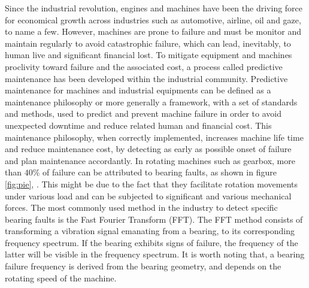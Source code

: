 \documentclass[../Main/thesis.tex]{subfiles}
\begin{document}
Since the industrial revolution, engines and machines have been the driving force for economical growth across industries such as automotive, airline, oil and gaze, to name a few. However, machines are prone to failure and must be monitor and maintain regularly to avoid catastrophic failure, which can lead, inevitably, to human live and significant financial lost. 
\justify
To mitigate equipment and machines proclivity toward failure and the associated cost, a process called predictive maintenance has been developed within the industrial community. Predictive maintenance  for machines and industrial equipments can be defined as a maintenance philosophy or more generally a framework, with a set of standards and methods, used to predict and prevent machine failure in order to avoid unexpected downtime and reduce related human and financial cost. This maintenance philosophy, when correctly implemented, increases machine life time and reduce maintenance cost, by detecting as early as possible onset of failure and plan maintenance accordantly.
\justify
In rotating machines such as gearbox, more than $40 \% $ of failure can be attributed to bearing faults, as shown in figure \ref{fig:pie}, \cite{patidar13}. This might be due to the fact that they facilitate rotation movements under various load and can be subjected to significant and various mechanical forces. The most commonly used method in the industry to detect specific bearing faults is the Fast Fourier Transform (FFT). The FFT method consists of transforming a vibration signal emanating from a bearing, to its corresponding frequency spectrum. If the bearing exhibits signs of failure, the frequency of the latter will be visible in the frequency spectrum. It is worth noting that, a bearing failure frequency is derived from the bearing geometry, and depends on the rotating speed of the machine.
\end{document}
